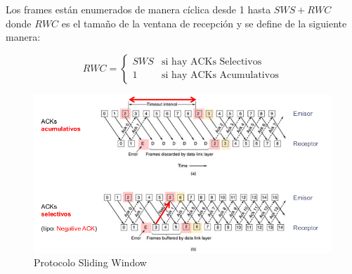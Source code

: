 Los frames están enumerados de manera cíclica desde 1 hasta \(SWS + RWC\) donde \(RWC\) es el tamaño de la ventana de recepción y se define de la siguiente manera:

\[
  RWC = \begin{cases}
    SWS & \text{si hay ACKs Selectivos} \\
    1 & \text{si hay ACKs Acumulativos}
  \end{cases}
\]

\begin{figure}[H]
	\centering
	\includegraphics[width=\textwidth
]{images/sliding-window.png}
	\caption[Protocolo Sliding Window]{Protocolo Sliding Window}
	\label{fig:sliding-window}
\end{figure}